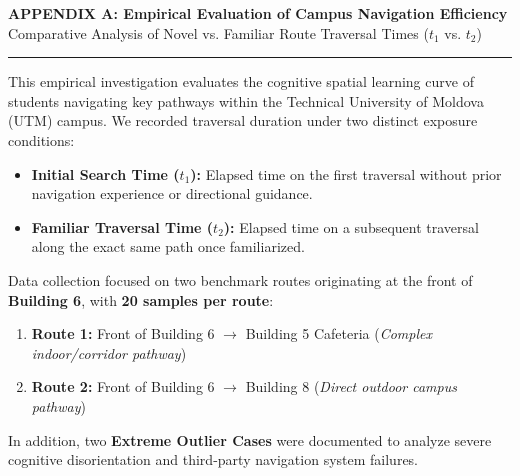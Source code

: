 \documentclass[11pt, a4paper]{article}
\begin{document}
\newpage
\pagestyle{plain}


\begin{center}
    {\Large \textbf{\textcolor{primary}{APPENDIX A: Empirical Evaluation of Campus Navigation Efficiency}}} \\[0.3em]
    {\large \textcolor{secondary}{Comparative Analysis of Novel vs. Familiar Route Traversal Times ($t_1$ vs. $t_2$)}} \\[0.5em]
    \rule{\textwidth}{1pt}
\end{center}

\vspace{0.5em}

\begin{tcolorbox}[title=Executive Summary \& Methodology]
This empirical investigation evaluates the cognitive spatial learning curve of students navigating key pathways within the Technical University of Moldova (UTM) campus. We recorded traversal duration under two distinct exposure conditions:
\begin{itemize}
    \item \textbf{Initial Search Time ($t_1$):} Elapsed time on the first traversal without prior navigation experience or directional guidance.
    \item \textbf{Familiar Traversal Time ($t_2$):} Elapsed time on a subsequent traversal along the exact same path once familiarized.
\end{itemize}
Data collection focused on two benchmark routes originating at the front of \textbf{Building 6}, with \textbf{20 samples per route}:
\begin{enumerate}
    \item \textbf{Route 1:} Front of Building 6 $\rightarrow$ Building 5 Cafeteria (\textit{Complex indoor/corridor pathway})
    \item \textbf{Route 2:} Front of Building 6 $\rightarrow$ Building 8 (\textit{Direct outdoor campus pathway})
\end{enumerate}
In addition, two \textbf{Extreme Outlier Cases} were documented to analyze severe cognitive disorientation and third-party navigation system failures.
\end{tcolorbox}

\vspace{1em}
\end{document}
